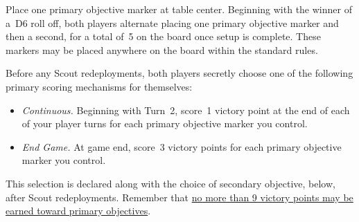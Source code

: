 
\smallskip
{}
\bigskip

\begin{tablesetup}

  \dawnofwar

  \smallskip%
  Place one primary objective marker at table center.  Beginning with
  the winner of a~D6 roll off, both players alternate placing one
  primary objective marker and then a second, for a total of~5 on the
  board once setup is complete.  These markers may be placed anywhere
  on the board within the standard rules.
\end{tablesetup}

\begin{missionrules}
\nightfighting
\end{missionrules}


\begin{scoring}
  
\begin{primaries}

  Before any Scout redeployments, both players secretly choose one of
  the following primary scoring mechanisms for themselves:

  \begin{itemize}
  \item {\textit{Continuous.}} Beginning with Turn~2, score~1 victory
    point at the end of each of your player turns for each primary
    objective marker you control.
  
  \item {\textit{End Game.}} At game end, score~3 victory points for
    each primary objective marker you control.
  
  \end{itemize}

  This selection is declared along with the choice of secondary
  objective, below, after Scout redeployments.  Remember that
  \underline{no more than 9 victory points may be earned toward
    primary objectives}.

\end{primaries}

\begin{secondaries}
  \interrogation
  \civilians
\end{secondaries}

\end{scoring}
